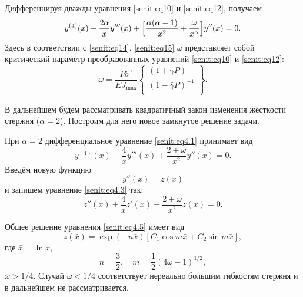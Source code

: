 Дифференцируя дважды уравнения \eqref{senit:eq10} и \eqref{senit:eq12}, получаем
\begin{equation}
\label{senit:eq4.1}
y^{(4)}(x)+\frac{2\alpha }{x}y'''(x)+\Bigl[\frac{\alpha (\alpha -1)}{x^2}+\frac{\omega }{x^\alpha }\Bigr]y''(x)=0.
\end{equation}
Здесь в соответствии с \eqref{senit:eq14}, \eqref{senit:eq15} $\omega $ представляет собой
критический параметр преобразованных уравнений \eqref{senit:eq10} и \eqref{senit:eq12}:
\begin{equation}
\label{senit:eq4.2}
\omega =\frac{P b^\alpha }{EJ_{\max } }\left\{ {\begin{array}{l}
 \left(1+\bar{\gamma} P \right) \\
 \left(1-\bar{\gamma} P \right)^{-1} \\
 \end{array}} \right\}.
\end{equation}

В дальнейшем будем рассматривать квадратичный закон изменения жёсткости стержня ($\alpha =2$).
Построим для него новое замкнутое решение задачи.

При $\alpha =2$ дифференциальное уравнение \eqref{senit:eq4.1} принимает вид
\begin{equation}
\label{senit:eq4.3}
y^{(4)}(x)+\frac{4}{x}y'''(x)+\frac{2+\omega }{x^2}y''(x)=0.
\end{equation}
Введём новую функцию
\begin{equation}
\label{senit:eq4.4}
y''(x)=z(x)
\end{equation}
и запишем уравнение \eqref{senit:eq4.3} так:
\begin{equation}
\label{senit:eq4.5}
z''(x)+\frac{4}{x}z'(x)+\frac{2+\omega }{x^2}z(x)=0.
\end{equation}

Общее решение уравнения \eqref{senit:eq4.5} имеет вид
\begin{equation}
\label{senit:eq4.8}
z(\bar{x})=\exp (-n\bar{x}) [C_1 \cos m\bar{x} +C_2 \sin m\bar{x} ], 
\end{equation}
где $\bar{x} =\ln x$,
\begin{equation}
\label{senit:eq4.9}
n=\frac{3}{2}, \quad m=\frac{1}{2}(4\omega -1)^{1/2},
\end{equation}
$\omega >{1}/{4}$. Случай $\omega <1/4$ соответствует нереально большим
гибкостям стержня и в дальнейшем не рассматривается.

